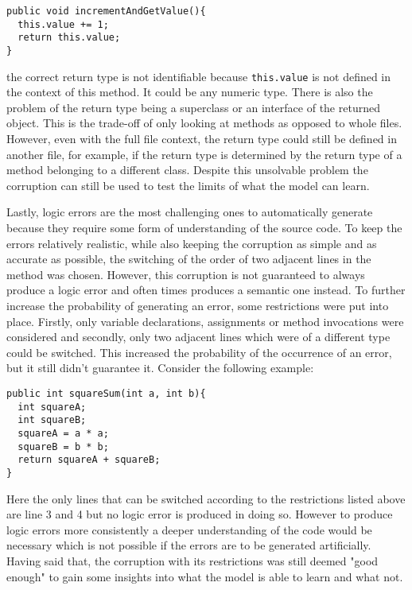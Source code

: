 \begin{lstlisting}[style=inline]
public void incrementAndGetValue(){
  this.value += 1;
  return this.value;
}
\end{lstlisting}

\noindent the correct return type is not identifiable because \texttt{this.value} is not defined in the context of this method. It could be any numeric type. There is also the problem of the return type being a superclass or an interface of the returned object. This is the trade-off of only looking at methods as opposed to whole files. However, even with the full file context, the return type could still be defined in another file, for example, if the return type is determined by the return type of a method belonging to a different class. Despite this unsolvable problem the corruption can still be used to test the limits of what the model can learn.

Lastly, logic errors are the most challenging ones to automatically generate because they require some form of understanding of the source code. To keep the errors relatively realistic, while also keeping the corruption as simple and as accurate as possible, the switching of the order of two adjacent lines in the method was chosen. However, this corruption is not guaranteed to always produce a logic error and often times produces a semantic one instead. To further increase the probability of generating an error, some restrictions were put into place. Firstly, only variable declarations, assignments or method invocations were considered and secondly, only two adjacent lines which were of a different type could be switched. This increased the probability of the occurrence of an error, but it still didn't guarantee it. Consider the following example:

\begin{lstlisting}[style=inline]
public int squareSum(int a, int b){
  int squareA;
  int squareB;
  squareA = a * a;
  squareB = b * b;
  return squareA + squareB;
}
\end{lstlisting}

Here the only lines that can be switched according to the restrictions listed above are line 3 and 4 but no logic error is produced in doing so. However to produce logic errors more consistently a deeper understanding of the code would be necessary which is not possible if the errors are to be generated artificially. Having said that, the corruption with its restrictions was still deemed "good enough" to gain some insights into what the model is able to learn and what not.

